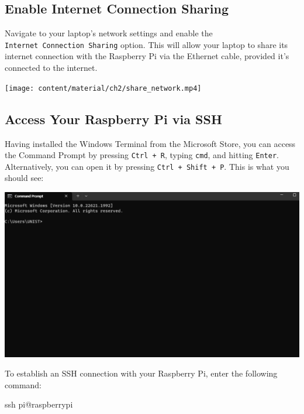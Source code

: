 \documentclass[
  letterpaper,
]{scrbook}
\newenvironment{Shaded}{\begin{snugshade}}{\end{snugshade}}
\newcommand{\FunctionTok}[1]{\textcolor[rgb]{0.28,0.35,0.67}{#1}}
\newcommand{\NormalTok}[1]{\textcolor[rgb]{0.00,0.23,0.31}{#1}}
\begin{document}
\hypertarget{enable-internet-connection-sharing}{%
\subsection{Enable Internet Connection
Sharing}\label{enable-internet-connection-sharing}}

Navigate to your laptop's network settings and enable the
\texttt{Internet\ Connection\ Sharing} option. This will allow your
laptop to share its internet connection with the Raspberry Pi via the
Ethernet cable, provided it's connected to the internet.

\texttt{[image: content/material/ch2/share\_network.mp4]}

\hypertarget{access-your-raspberry-pi-via-ssh}{%
\subsection{Access Your Raspberry Pi via
SSH}\label{access-your-raspberry-pi-via-ssh}}

Having installed the Windows Terminal from the Microsoft Store, you can
access the Command Prompt by pressing \texttt{Ctrl\ +\ R}, typing
\texttt{cmd}, and hitting \texttt{Enter}. Alternatively, you can open it
by pressing \texttt{Ctrl\ +\ Shift\ +\ P}. This is what you should see:

\includegraphics{content/material/ch2/cmd_screen.png}

To establish an SSH connection with your Raspberry Pi, enter the
following command:

\begin{Shaded}
\begin{Highlighting}[]
\FunctionTok{ssh}\NormalTok{ pi@raspberrypi}
\end{Highlighting}
\end{Shaded}
\end{document}
